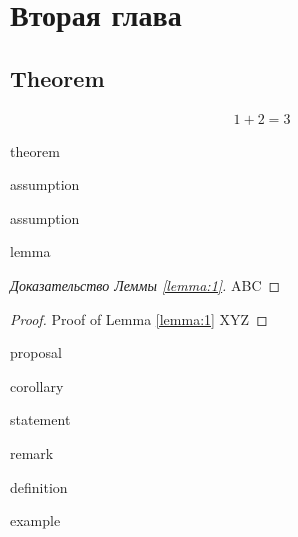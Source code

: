 \chapter{Вторая глава}
\label{ch:ch2}

\section{Theorem} \label{chap1:sec1}

	\begin{align} \label{eq:sec1}
		1+2=3
	\end{align}

	\begin{theorem}
		theorem
	\end{theorem}
	
	\begin{assumption}
		assumption
	\end{assumption}
	\begin{assumption}
		assumption
	\end{assumption}
	
	\begin{lemma}
		\label{lemma:1}
		lemma
	\end{lemma}
	
	\begin{proof}[Доказательство Леммы \ref{lemma:1}]
		ABC 
	\end{proof}
	\begin{proof} Proof of Lemma \cref{lemma:1}
		XYZ
	\end{proof}
	
	\begin{proposal}
		proposal
	\end{proposal}
		
	\begin{corollary}
		corollary
	\end{corollary}
	
	\begin{statement}
		statement
	\end{statement}
	
	\begin{remark}
		remark
	\end{remark}
	
	\begin{definition}
		definition
	\end{definition}
	
	\begin{example}
		example
	\end{example}
	
